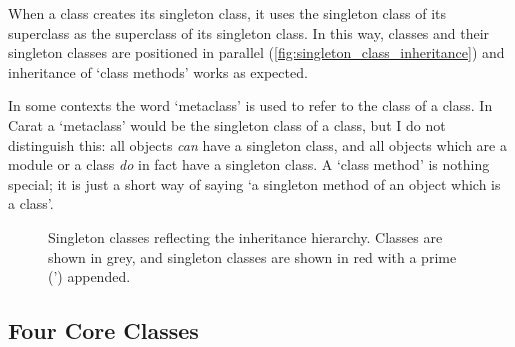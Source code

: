 When a class creates its singleton class, it uses the singleton class of its superclass as the superclass of its singleton class. In this way, classes and their singleton classes are positioned in parallel (\autoref{fig:singleton_class_inheritance}) and inheritance of `class methods' works as expected.

In some contexts the word `metaclass' is used to refer to the class of a class. In Carat a `metaclass' would be the singleton class of a class, but I do not distinguish this: all objects \textit{can} have a singleton class, and all objects which are a module or a class \textit{do} in fact have a singleton class. A `class method' is nothing special; it is just a short way of saying `a singleton method of an object which is a class'.

\begin{figure}
\begin{center}
\caption{Singleton classes reflecting the inheritance hierarchy. Classes are shown in grey, and singleton classes are shown in red with a prime (') appended.}
\label{fig:singleton_class_inheritance}
\end{center}
\end{figure}

\subsection{Four Core Classes}


